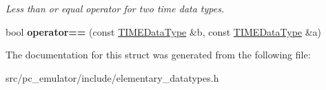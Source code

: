 \begin{DoxyCompactItemize}
\begin{DoxyCompactList}\small\item\em Less than or equal operator for two time data types. \end{DoxyCompactList}\item 
bool {\bfseries operator==} (const \hyperlink{structpc__emulator_1_1TIMEDataType}{T\+I\+M\+E\+Data\+Type} \&b, const \hyperlink{structpc__emulator_1_1TIMEDataType}{T\+I\+M\+E\+Data\+Type} \&a)\hypertarget{structpc__emulator_1_1TIMEDataType_a0926890fc3026d59c82e4a85e1c58895}{}\label{structpc__emulator_1_1TIMEDataType_a0926890fc3026d59c82e4a85e1c58895}

\end{DoxyCompactItemize}


The documentation for this struct was generated from the following file\+:\begin{DoxyCompactItemize}
\item 
src/pc\+\_\+emulator/include/elementary\+\_\+datatypes.\+h\end{DoxyCompactItemize}
